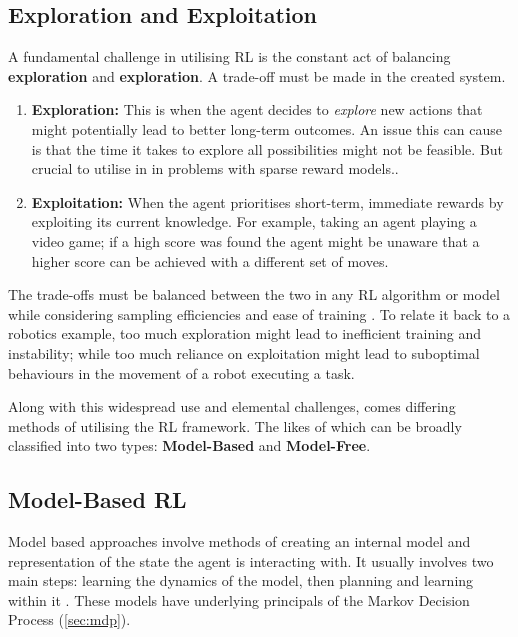   \subsection{Exploration and Exploitation}
  
  A fundamental challenge in utilising RL is the constant act of balancing \textbf{exploration} and \textbf{exploration}. A trade-off must be made in the created system.
  \begin{enumerate}
    \item \textbf{Exploration:}
    This is when the agent decides to \emph{explore} new actions that might potentially lead to better long-term outcomes. An issue this can cause is that the time it takes to explore all possibilities might not be feasible. But crucial to utilise in in problems with sparse reward models..
    \item \textbf{Exploitation:}
    When the agent prioritises short-term, immediate rewards by exploiting its current knowledge. For example, taking an agent playing a video game; if a high score was found the agent might be unaware that a higher score can be achieved with a different set of moves. 
  \end{enumerate}

  The trade-offs must be balanced between the two in any RL algorithm or model while considering sampling efficiencies and ease of training \cite{liu2019simpleexplorationsampleefficient}. To relate it back to a robotics example, too much exploration might lead to inefficient training and instability; while too much reliance on exploitation might lead to suboptimal behaviours in the movement of a robot executing a task. 

  
  Along with this widespread use and elemental challenges, comes differing methods of utilising the RL framework. The likes of which can be broadly classified into two types: \textbf{Model-Based} and \textbf{Model-Free}.
  
  \subsection{Model-Based RL}
  Model based approaches involve methods of creating an internal model and representation of the state the agent is interacting with. It usually involves two main steps: learning the dynamics of the model, then planning and learning within it \cite{MAL-086}. These models have underlying principals of the Markov Decision Process (\ref{sec:mdp}).

